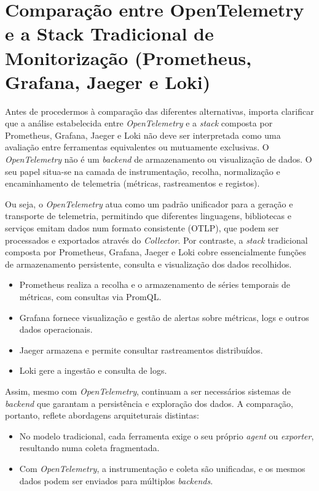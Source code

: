 \section{Comparação entre OpenTelemetry e a Stack Tradicional de Monitorização (Prometheus, Grafana, Jaeger e Loki)}


Antes de procedermos à comparação das diferentes alternativas, importa clarificar que a análise estabelecida entre \textit{OpenTelemetry} e a \textit{stack} composta por Prometheus, Grafana, Jaeger e Loki não deve ser interpretada como uma avaliação entre ferramentas equivalentes ou mutuamente exclusivas. O \textit{OpenTelemetry} não é um \textit{backend} de armazenamento ou visualização de dados. O seu papel situa-se na camada de instrumentação, recolha, normalização e encaminhamento de telemetria (métricas, rastreamentos e registos).

Ou seja, o \textit{OpenTelemetry} atua como um padrão unificador para a geração e transporte de telemetria, permitindo que diferentes linguagens, bibliotecas e serviços emitam dados num formato consistente (OTLP), que podem ser processados e exportados através do \textit{Collector}. Por contraste, a \textit{stack} tradicional composta por Prometheus, Grafana, Jaeger e Loki cobre essencialmente funções de armazenamento persistente, consulta e visualização dos dados recolhidos.

\begin{itemize}
\item Prometheus realiza a recolha e o armazenamento de séries temporais de métricas, com consultas via PromQL.
\item Grafana fornece visualização e gestão de alertas sobre métricas, logs e outros dados operacionais.
\item Jaeger armazena e permite consultar rastreamentos distribuídos.
\item Loki gere a ingestão e consulta de logs.
\end{itemize}

Assim, mesmo com \textit{OpenTelemetry}, continuam a ser necessários sistemas de \textit{backend} que garantam a persistência e exploração dos dados. A comparação, portanto, reflete abordagens arquiteturais distintas:

\begin{itemize}
\item No modelo tradicional, cada ferramenta exige o seu próprio \textit{agent} ou \textit{exporter}, resultando numa coleta fragmentada.
\item Com \textit{OpenTelemetry}, a instrumentação e coleta são unificadas, e os mesmos dados podem ser enviados para múltiplos \textit{backends}.
\end{itemize}

